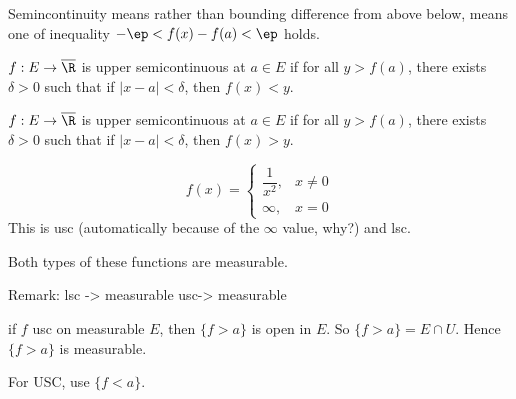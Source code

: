 Semincontinuity means rather than bounding difference from above below, means one of inequality $-\ep<f(x)-f(a)<\ep$ holds. 




\begin{dfn}
$f: E \to \overline{\R}$ is upper semicontinuous at $a \in E$ if for all $y>f(a)$, there exists $\delta>0$ such that if $|x-a|<\delta$, then $f(x)<y$. 
\end{dfn}




\begin{dfn}
$f: E \to \overline{\R}$ is upper semicontinuous at $a \in E$ if for all $y>f(a)$, there exists $\delta>0$ such that if $|x-a|<\delta$, then $f(x)>y$. 
\end{dfn}

\begin{ex}
	\[
	f(x)=
	\begin{cases}
	\dfrac{1}{x^2}, & x \neq 0 \\
	\infty, & x=0
	\end{cases}
	\]
This is usc (automatically because of the $\infty$ value, why?) and lsc. 
\end{ex}

Both types of these functions are measurable. 



Remark: lsc -> measurable
usc-> measurable

\pf if $f$ usc on measurable $E$, then $\{f>a\}$ is open in $E$. So $\{f>a\}=E \cap U$. Hence $\{f>a\}$ is measurable.

For USC, use $\{f<a\}$.







